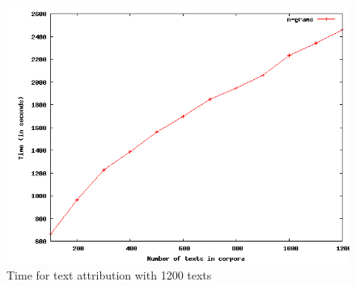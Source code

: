 \begin{figure}[!hbp]
\includegraphics[width=\textwidth]{tabeller/work.png}
\caption{Time for text attribution with 1200 texts \label{fig:work}}
\end{figure}

